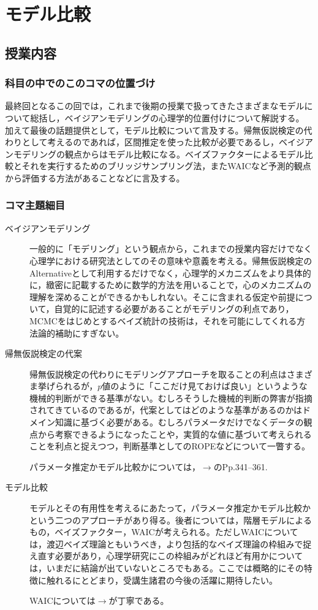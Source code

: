 \section{モデル比較}
\subsection{授業内容}
\subsubsection{科目の中でのこのコマの位置づけ}
最終回となるこの回では，これまで後期の授業で扱ってきたさまざまなモデルについて総括し，ベイジアンモデリングの心理学的位置付けについて解説する。
加えて最後の話題提供として，モデル比較について言及する。帰無仮説検定の代わりとして考えるのであれば，区間推定を使った比較が必要であるし，ベイジアンモデリングの観点からはモデル比較になる。ベイズファクターによるモデル比較とそれを実行するためのブリッジサンプリング法，またWAICなど予測的観点から評価する方法があることなどに言及する。
\subsubsection{コマ主題細目}
\begin{description}
	\item[ベイジアンモデリング] 一般的に「モデリング」という観点から，これまでの授業内容だけでなく心理学における研究法としてのその意味や意義を考える。帰無仮説検定のAlternativeとして利用するだけでなく，心理学的メカニズムをより具体的に，緻密に記載するために数学的方法を用いることで，心のメカニズムの理解を深めることができるかもしれない。そこに含まれる仮定や前提について，自覚的に記述する必要があることがモデリングの利点であり，MCMCをはじめとするベイズ統計の技術は，それを可能にしてくれる方法論的補助にすぎない。
	\item[帰無仮説検定の代案] 帰無仮説検定の代わりにモデリングアプローチを取ることの利点はさまざま挙げられるが，$p$値のように「ここだけ見ておけば良い」というような機械的判断ができる基準がない。むしろそうした機械的判断の弊害が指摘されてきているのであるが，代案としてはどのような基準があるのかはドメイン知識に基づく必要がある。むしろパラメータだけでなくデータの観点から考察できるようになったことや，実質的な値に基づいて考えられることを利点と捉えつつ，判断基準としてのROPEなどについて一瞥する。
	      \begin{flushright}
		      パラメータ推定かモデル比較かについては，$\to$\citet{Maeda2017}のPp.341--361.
	      \end{flushright}
	\item[モデル比較] モデルとその有用性を考えるにあたって，パラメータ推定かモデル比較かという二つのアプローチがあり得る。後者については，階層モデルによるもの，ベイズファクター，WAICが考えられる。ただしWAICについては，渡辺ベイズ理論ともいうべき，より包括的なベイズ理論の枠組みで捉え直す必要があり，心理学研究にこの枠組みがどれほど有用かについては，いまだに結論が出ていないところでもある。ここでは概略的にその特徴に触れるにとどまり，受講生諸君の今後の活躍に期待したい。
	      \begin{flushright}
		      WAICについては$\to$\citet{Hamada201912}が丁寧である。
	      \end{flushright}
\end{description}
